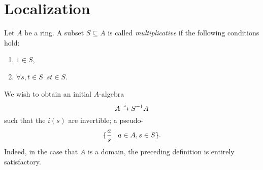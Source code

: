 \section{Localization}
\begin{df}
Let $A$ be a ring. A subset $S \subseteq A$ is called \textit{multiplicative} if the following conditions hold:
\begin{enumerate}
\item $1 \in S$,
\item $\forall s, t \in S \enspace st \in S$.
\end{enumerate}
\end{df}


We wish to obtain an initial $A$-algebra
\[A \xrightarrow{i} S^{-1}A\]
such that the $i(s)$ are invertible; a pseudo-
\[ \{\frac{a}{s} \mathrel{|} a \in A, s \in S \}.\]
Indeed, in the case that $A$ is a domain, the preceding definition is entirely satisfactory.

